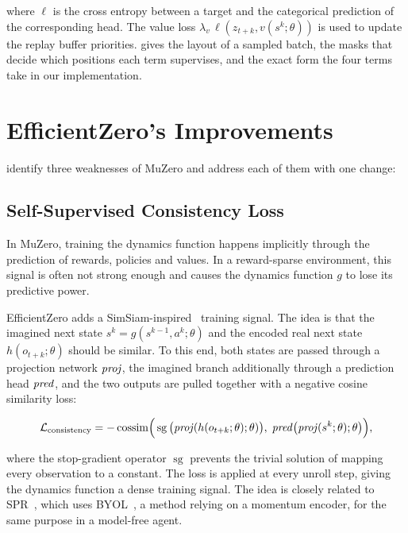 where $\ell$ is the cross entropy between a target and the categorical
prediction of the corresponding head.
The value loss $\lambda_v\,\ell\!\left(z_{t+k},v(s^k;\theta)\right)$ is used to update
the replay buffer priorities.
 gives the layout of a sampled batch, the masks that decide which positions each
term supervises, and the exact form the four terms take in our implementation.

\section{EfficientZero's Improvements}\label{sec:ez-improvements}

\Textcite{ye_mastering_2021} identify three weaknesses of MuZero and address
each of them with one change:

\subsection{Self-Supervised Consistency Loss}\label{sec:ez-consistency}

In MuZero, training the dynamics function happens implicitly through the prediction
of rewards, policies and values.
In a reward-sparse environment, this signal is often not strong enough and causes
the dynamics function $g$ to lose its predictive power.

EfficientZero adds a SimSiam-inspired~\cite{chen_exploring_2020}
training signal.
The idea is that the imagined next state $s^{k}=g(s^{k-1},a^{k};\theta)$
and the encoded real next state $h(o_{t+k};\theta)$ should be similar.
To this end, both states are passed through a projection network $\mathit{proj}$, the
imagined branch additionally through a prediction head $\mathit{pred}$, and the two
outputs are pulled together with a negative cosine similarity loss:

\begin{equation}\label{eq:ez-consistency}
  \mathcal{L}_{\text{consistency}}
  = -\operatorname{cossim}\!\Big(
      \operatorname{sg}\big(\mathit{proj}(h(o_{t+k};\theta);\theta)\big),\;
      \mathit{pred}\big(\mathit{proj}(s^{k};\theta);\theta\big)
    \Big),
\end{equation}

where the stop-gradient operator $\operatorname{sg}$ prevents the trivial
solution of mapping every observation to a constant.
The loss is applied at every unroll step, giving the dynamics function a dense
training signal.
The idea is closely related to SPR~\cite{schwarzer_data-efficient_2021}, which
uses BYOL~\cite{grill_bootstrap_2020}, a method relying on a momentum encoder,
for the same purpose in a model-free agent.

